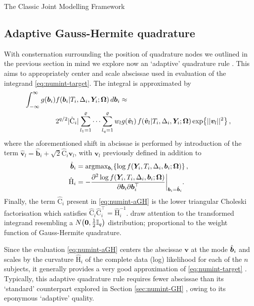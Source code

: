 \begin{chapter}{\label{cha:methods-classic}The Classic Joint Modelling Framework}
\subsection{Adaptive Gauss-Hermite quadrature}\label{sec:numint-aGH}
With consternation surrounding the position of quadrature nodes we outlined in the previous section in mind we explore now an `adaptive' quadrature rule \citep{Pinheiro1995}. This aims to appropriately center and scale abscissae used in evaluation of the integrand \eqref{eq:numint-target}. The integral is approximated by
\begin{align}
    \int_{-\infty}^\infty g\!\left(\bm{b}_i\right) &f\!\left(\bm{b}_i|T_i,\Delta_i,\bm{Y}_i;\bm{\mathrm{\Omega}}\right) d\bm{b}_i \approx \nonumber\\
    & 2^{q/2}|\hat{\mathrm{C}}_i|\sum_{l_1=1}^\varrho\dots\sum_{l_q=1}^\varrho w_l g\!\left( \hat{\bm{v}}_l\right) f\!\left( \hat{\bm{v}}_l|T_i,\Delta_i,\bm{Y}_i;\bm{\mathrm{\Omega}}\right)\exp\!\left\{||\bm{v}_l||^2\right\},
\label{eq:numint-aGH}
\end{align}
where the aforementioned shift in abcissae is performed by introduction of the term $\hat{\bm{v}}_l=\hat{\bm{b}}_i+\sqrt{2}\hat{\mathrm{C}}_i\bm{v}_l$, with $\bm{v}_l$ previously defined in addition to
\begin{align}
    \hat{\bm{b}}_i &= \arg\!\max{}\!_{\bm{b}_i}\!\left\{\log f\!\left(\bm{Y}_i, T_i, \Delta_i, \bm{b}_i;\bm{\mathrm{\Omega}}\right)\right\}, \label{eq:argmaxb}\\
    \hat{\mathrm{H}}_i&=-\frac{\partial^2\log f\!\left(\bm{Y}_i, T_i, \Delta_i, \bm{b}_i;\bm{\mathrm{\Omega}}\right)}{\partial\bm{b}_i\partial\bm{b}_i^\top}\bigg\rvert_{\bm{b}_i=\hat{\bm{b}}_i}. \label{eq:Hessb}
\end{align}
Finally, the term $\hat{\mathrm{C}}_i$ present in \eqref{eq:numint-aGH} is the lower triangular Choleski factorisation which satisfies $\hat{\mathrm{C}}_i\hat{\mathrm{C}}_i^\top=\hat{\mathrm{H}}_i^{-1}$. \citet{RizopoulosJMbook} draw attention to the transformed integrand resembling a $N\!\left(\bm{0},\frac{1}{2}\mathbb{I}_q\right)$ distribution; proportional to the weight function of Gauss-Hermite quadrature.

Since the evaluation \eqref{eq:numint-aGH} centers the abscissae $\bm{v}$ at the mode $\hat{\bm{b}}_i$ and scales by the curvature $\hat{\mathrm{H}}_i$ of the complete data (log) likelihood for each of the $n$ subjects, it generally provides a very good approximation of \eqref{eq:numint-target} \citep{Stringer2022}. Typically, this adaptive quadrature rule requires fewer abscissae than its `standard' counterpart explored in Section \ref{sec:numint-GH} \citep{RizopoulosJMbook}, owing to its eponymous `adaptive' quality.


\end{chapter}
